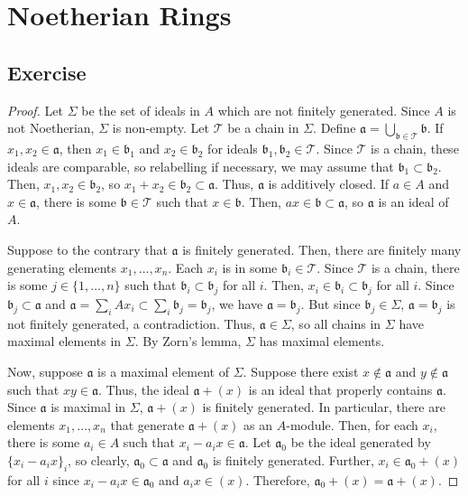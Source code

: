 \section{Noetherian Rings}

\subsection{Exercise}\label{7.1}

\begin{proof}
Let $\Sigma$ be the set of ideals in $A$ which are not finitely generated. Since $A$ is not Noetherian, $\Sigma$ is non-empty. Let $\mathcal{T}$ be a chain
in $\Sigma$. Define $\mathfrak{a} = \bigcup_{\mathfrak{b} \in \mathcal{T}}\mathfrak{b}$. If $x_1,x_2 \in \mathfrak{a}$, then $x_1 \in \mathfrak{b}_1$ and $x_2 \in \mathfrak{b}_2$
for ideals $\mathfrak{b}_1,\mathfrak{b}_2 \in \mathcal{T}$. Since $\mathcal{T}$ is a chain, these ideals are comparable, so relabelling if necessary, we may assume that
$\mathfrak{b}_1 \subset \mathfrak{b}_2$. Then, $x_1,x_2 \in \mathfrak{b}_2$, so $x_1 + x_2 \in \mathfrak{b}_2 \subset \mathfrak{a}$. Thus, $\mathfrak{a}$ is additively closed.
If $a \in A$ and $x \in \mathfrak{a}$, there is some $\mathfrak{b} \in \mathcal{T}$ such that $x \in \mathfrak{b}$. Then, $ax \in \mathfrak{b} \subset \mathfrak{a}$, so
$\mathfrak{a}$ is an ideal of $A$.

Suppose to the contrary that $\mathfrak{a}$ is finitely generated. Then, there are finitely many generating elements $x_1,\ldots,x_n$. Each $x_i$ is in some $\mathfrak{b}_i \in \mathcal{T}$.
Since $\mathcal{T}$ is a chain, there is some $j \in \{1,\ldots,n\}$ such that $\mathfrak{b}_i \subset \mathfrak{b}_j$ for all $i$. Then, $x_i \in \mathfrak{b}_i \subset \mathfrak{b}_j$
for all $i$. Since $\mathfrak{b}_j \subset \mathfrak{a}$ and $\mathfrak{a} = \sum_i A x_i \subset \sum_i \mathfrak{b}_j = \mathfrak{b}_j$, we have $\mathfrak{a} = \mathfrak{b}_j$. But
since $\mathfrak{b}_j \in \Sigma$, $\mathfrak{a} = \mathfrak{b}_j$ is not finitely generated, a contradiction. Thus, $\mathfrak{a} \in \Sigma$, so all chains in $\Sigma$ have maximal
elements in $\Sigma$. By Zorn's lemma, $\Sigma$ has maximal elements.

Now, suppose $\mathfrak{a}$ is a maximal element of $\Sigma$. Suppose there exist $x \not\in \mathfrak{a}$ and $y \not\in \mathfrak{a}$ such that $xy \in \mathfrak{a}$. Thus, the ideal
$\mathfrak{a} + (x)$ is an ideal that properly contains $\mathfrak{a}$. Since $\mathfrak{a}$ is maximal in $\Sigma$, $\mathfrak{a} + (x)$ is finitely generated. In particular, there are
elements $x_1,\ldots,x_n$ that generate $\mathfrak{a} + (x)$ as an $A$-module. Then, for each $x_i$, there is some $a_i \in A$ such that $x_i - a_i x \in \mathfrak{a}$. Let $\mathfrak{a}_0$
be the ideal generated by $\{x_i - a_i x\}_i$, so clearly, $\mathfrak{a}_0 \subset \mathfrak{a}$ and $\mathfrak{a}_0$ is finitely generated. Further, $x_i \in \mathfrak{a}_0 + (x)$ for all $i$
since $x_i - a_i x \in \mathfrak{a}_0$ and $a_i x \in (x)$. Therefore, $\mathfrak{a}_0 + (x) = \mathfrak{a} + (x)$.


\end{proof}
